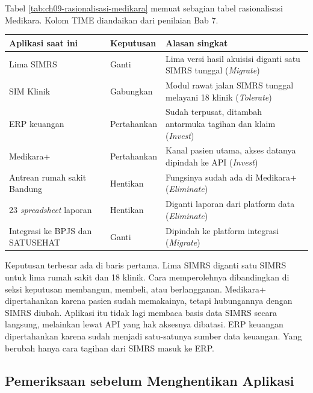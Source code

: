 \begin{kasus}[title={Kasus Medikara Health: Konsolidasi Lima SIMRS, Posisi Medikara+, dan ERP}]
Tabel \ref{tab:ch09-rasionalisasi-medikara} memuat sebagian tabel
rasionalisasi Medikara. Kolom TIME diandaikan dari penilaian Bab 7.

\begin{center}
  \label{tab:ch09-rasionalisasi-medikara}
  \small
  \begin{tabularx}{\linewidth}{llX}
    \hline
    \textbf{Aplikasi saat ini} & \textbf{Keputusan} & \textbf{Alasan singkat} \\
    \hline
    Lima SIMRS & Ganti & Lima versi hasil akuisisi diganti satu SIMRS tunggal (\textit{Migrate}) \\
    \hline
    SIM Klinik & Gabungkan & Modul rawat jalan SIMRS tunggal melayani 18 klinik (\textit{Tolerate}) \\
    \hline
    ERP keuangan & Pertahankan & Sudah terpusat, ditambah antarmuka tagihan dan klaim (\textit{Invest}) \\
    \hline
    Medikara+ & Pertahankan & Kanal pasien utama, akses datanya dipindah ke API (\textit{Invest}) \\
    \hline
    Antrean rumah sakit Bandung & Hentikan & Fungsinya sudah ada di Medikara+ (\textit{Eliminate}) \\
    \hline
    23 \textit{spreadsheet} laporan & Hentikan & Diganti laporan dari platform data (\textit{Eliminate}) \\
    \hline
    Integrasi ke BPJS dan SATUSEHAT & Ganti & Dipindah ke platform integrasi (\textit{Migrate}) \\
    \hline
  \end{tabularx}
\end{center}

Keputusan terbesar ada di baris pertama. Lima SIMRS diganti satu SIMRS untuk
lima rumah sakit dan 18 klinik. Cara memperolehnya dibandingkan di seksi
keputusan membangun, membeli, atau berlangganan. Medikara+ dipertahankan
karena pasien sudah memakainya, tetapi hubungannya dengan SIMRS diubah.
Aplikasi itu tidak lagi membaca basis data SIMRS secara langsung, melainkan
lewat API yang hak aksesnya dibatasi. ERP keuangan dipertahankan karena
sudah menjadi satu-satunya sumber data keuangan. Yang berubah hanya cara
tagihan dari SIMRS masuk ke ERP.
\end{kasus}

\subsection*{Pemeriksaan sebelum Menghentikan Aplikasi}

